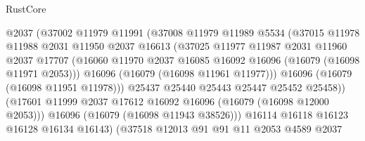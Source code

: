 \begin{lexlean}{RustCore}
\begin{coremodule}
                              @2037
                              (@37002
                                @11979
                                @11991
                                (@37008
                                  @11979
                                  @11989
                                  @5534
                                  (@37015
                                    @11978
                                    @11988
                                    @2031
                                    @11950
                                    @2037
                                    @16613
                                    (@37025
                                      @11977
                                      @11987
                                      @2031
                                      @11960
                                      @2037
                                      @17707
                                      (@16060
                                        @11970
                                        @2037
                                        @16085
                                        @16092
                                        @16096
                                        (@16079 (@16098 @11971 @2053)))
                                      @16096
                                      (@16079 (@16098 @11961 @11977)))
                                    @16096
                                    (@16079 (@16098 @11951 @11978)))
                                  @25437
                                  @25440
                                  @25443
                                  @25447
                                  @25452
                                  @25458))
                              (@17601
                                @11999
                                @2037
                                @17612
                                @16092
                                @16096
                                (@16079 (@16098 @12000 @2053)))
                              @16096
                              (@16079 (@16098 @11943 @38526)))
                            @16114
                            @16118
                            @16123
                            @16128
                            @16134
                            @16143)
                          (@37518
                            @12013
                            @91
                            @91
                            @11
                            @2053
                            @4589
                            @2037

\end{coremodule}
\end{lexlean}
